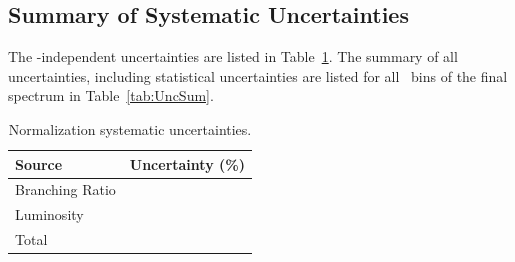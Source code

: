 \subsection{Summary of Systematic Uncertainties}
%

The \pt-independent uncertainties are listed in Table~\ref{tab:CorrFixSystUnc}. 
The summary of all uncertainties, including statistical uncertainties are listed for all \ptchjet\ bins of the final spectrum in Table~\ref{tab:UncSum}.

\begin{table}[bth]
\caption{Normalization systematic uncertainties.}
     \label{tab:CorrFixSystUnc}
\begin{center}
    \begin{tabular}{lr}
    \hline
Source & Uncertainty (\%) \\ \hline
Branching Ratio &  \\
Luminosity &  \\
\hline
Total &  \\
\hline
    \end{tabular}
    \end{center}
    \end{table}
    
